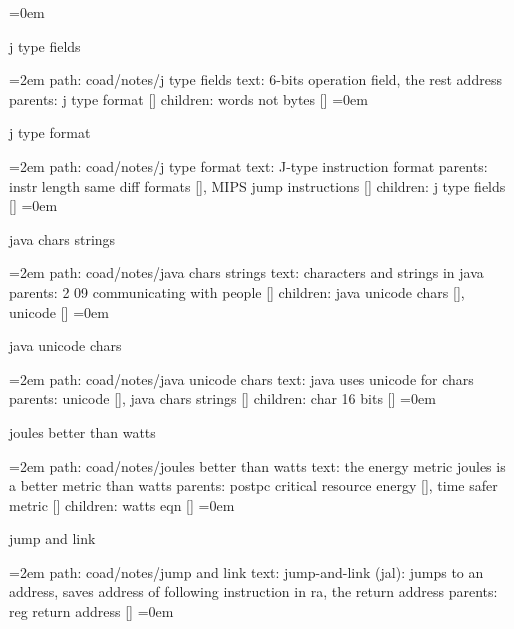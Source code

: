 \smallskip
\leftskip=0em
\par\endgroup
\bigskip
{}
j type fields
\smallskip
\par\begingroup
\leftskip=2em
path: coad/notes/j type fields
\smallskip
text:  6-bits operation field, the rest address
\smallskip
parents:  j type format []
\smallskip
children: words not bytes []
\smallskip
\leftskip=0em
\par\endgroup
\bigskip
{}
j type format
\smallskip
\par\begingroup
\leftskip=2em
path: coad/notes/j type format
\smallskip
text:  J-type instruction format
\smallskip
parents:  instr length same diff formats [], MIPS jump instructions []
\smallskip
children: j type fields []
\smallskip
\leftskip=0em
\par\endgroup
\bigskip
{}
java chars strings
\smallskip
\par\begingroup
\leftskip=2em
path: coad/notes/java chars strings
\smallskip
text:  characters and strings in java
\smallskip
parents:  2 09 communicating with people []
\smallskip
children: java unicode chars [], unicode []
\smallskip
\leftskip=0em
\par\endgroup
\bigskip
{}
java unicode chars
\smallskip
\par\begingroup
\leftskip=2em
path: coad/notes/java unicode chars
\smallskip
text:  java uses unicode for chars
\smallskip
parents:  unicode [], java chars strings []
\smallskip
children: char 16 bits []
\smallskip
\leftskip=0em
\par\endgroup
\bigskip
{}
joules better than watts
\smallskip
\par\begingroup
\leftskip=2em
path: coad/notes/joules better than watts
\smallskip
text:  the energy metric joules is a better metric than watts
\smallskip
parents:  postpc critical resource energy [], time safer metric []
\smallskip
children: watts eqn []
\smallskip
\leftskip=0em
\par\endgroup
\bigskip
{}
jump and link
\smallskip
\par\begingroup
\leftskip=2em
path: coad/notes/jump and link
\smallskip
text:  jump-and-link (jal): jumps to an address, saves address of following instruction in ra, the return address
\smallskip
parents:  reg return address []
\smallskip
\leftskip=0em
\par\endgroup
\bigskip
